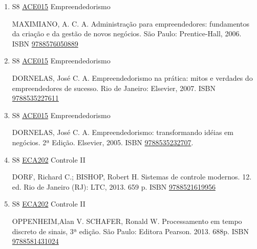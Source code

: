 \documentclass[12pt,a4paper]{book}
\begin{document}
\begin{enumerate}
  DRUCKER, P.  F.;  Inovação e espírito empreendedor (entrepreneurship): prática e princípios.  São Paulo: Pioneira Thomson Learning, 2003.  ISBN \href{http://www.bn.br/site/pages/servicosProfissionais/agenciaISBN/isbnBusca/FbnBuscaISBNCatalogo.asp?pField=ISBN&pIntPagina=1&pISBN=22108596&nidbISBN=true&hidbISBN=true}{9788522108596}
 
 
 \item S8 \hyperref[PUD:ACE015]{ACE015} Empreendedorismo

  MAXIMIANO, A.  C.  A.  Administração para empreendedores: fundamentos da criação e da gestão de novos negócios.  São Paulo: Prentice-Hall, 2006.  ISBN \href{http://www.bn.br/site/pages/servicosProfissionais/agenciaISBN/isbnBusca/FbnBuscaISBNCatalogo.asp?pField=ISBN&pIntPagina=1&pISBN=76050889&nidbISBN=true&hidbISBN=true}{9788576050889}
 
 
 \item S8 \hyperref[PUD:ACE015]{ACE015} Empreendedorismo

  DORNELAS, José C.  A.  Empreendedorismo na prática: mitos e verdades do empreendedores de sucesso.  Rio de Janeiro: Elsevier, 2007.  ISBN \href{http://www.bn.br/site/pages/servicosProfissionais/agenciaISBN/isbnBusca/FbnBuscaISBNCatalogo.asp?pField=ISBN&pIntPagina=1&pISBN=35227611&nidbISBN=true&hidbISBN=true}{9788535227611}
 
 
 \item S8 \hyperref[PUD:ACE015]{ACE015} Empreendedorismo

  DORNELAS, José C.  A.  Empreendedorismo: transformando idéias em negócios.  2ª Edição.  Elsevier, 2005.  ISBN \href{http://www.bn.br/site/pages/servicosProfissionais/agenciaISBN/isbnBusca/FbnBuscaISBNCatalogo.asp?pField=ISBN&pIntPagina=1&pISBN=35232707&nidbISBN=true&hidbISBN=true}{9788535232707}.
 \item S8 \hyperref[PUD:ECA202]{ECA202} Controle II

 DORF, Richard C.;  BISHOP, Robert H.  Sistemas de controle modernos.  12. ed.  Rio de Janeiro (RJ): LTC, 2013.  659 p.  ISBN \href{http://www.bn.br/site/pages/servicosProfissionais/agenciaISBN/isbnBusca/FbnBuscaISBNCatalogo.asp?pField=ISBN&pIntPagina=1&pISBN=21619956&nidbISBN=true&hidbISBN=true}{9788521619956}

 
 
 \item S8 \hyperref[PUD:ECA202]{ECA202} Controle II

  OPPENHEIM,Alan V.  SCHAFER, Ronald W.  Processamento em tempo discreto de sinais, 3ª edição.  São Paulo: Editora Pearson.  2013.  688p.  ISBN \href{http://www.bn.br/site/pages/servicosProfissionais/agenciaISBN/isbnBusca/FbnBuscaISBNCatalogo.asp?pField=ISBN&pIntPagina=1&pISBN=81431024&nidbISBN=true&hidbISBN=true}{9788581431024}


\end{enumerate}
\end{document}
